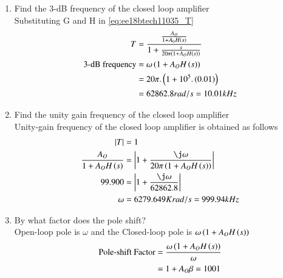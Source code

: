 \begin{enumerate}[label=\thesubsection.\arabic*.,ref=\thesubsection.\theenumi]
\item Find the 3-dB frequency of the closed loop amplifier\\
\solution Substituting G and H in \eqref{eq:ee18btech11035_T}
\begin{align}
    T&=\frac{\frac{A_{O}}{1+A_{0}H\left(s\right)}}{1+\frac{s}{20\pi\left(1+A_{O}H\left(s\right)\right)}}\\
    \text{3-dB frequency}&=\omega\left(1+A_{O}H\left(s\right)\right)\\
    &=20\pi.\left(1+10^5.\left(0.01\right)\right)\\
    &=62862.8rad/s=10.01kHz
\end{align}

\item Find the unity gain frequency of the closed loop amplifier\\
\solution Unity-gain frequency of the closed loop amplifier is obtained as follows
\begin{align}
    \abs{T}&=1\\
    \frac{A_{O}}{1+A_{O}H\brak{s}}&=\abs{1+\frac{\j\omega}{20\pi\brak{1+A_{O}H\brak{s}}}}\\
    99.900&=\abs{1+\frac{\j\omega}{62862.8}}\\
    \omega&=6279.649Krad/s=999.94kHz
\end{align}
\item By what factor does the pole shift?\\
\solution Open-loop pole is $\omega$ and the Closed-loop pole is $\omega\left(1+A_{O}H\left(s\right)\right)$\\
\begin{align}
    \text{Pole-shift Factor}&=\frac{\omega\left(1+A_{O}H\left(s\right)\right)}{\omega}\\
    &=1+A_{O}\beta=1001
\end{align}


\end{enumerate}
